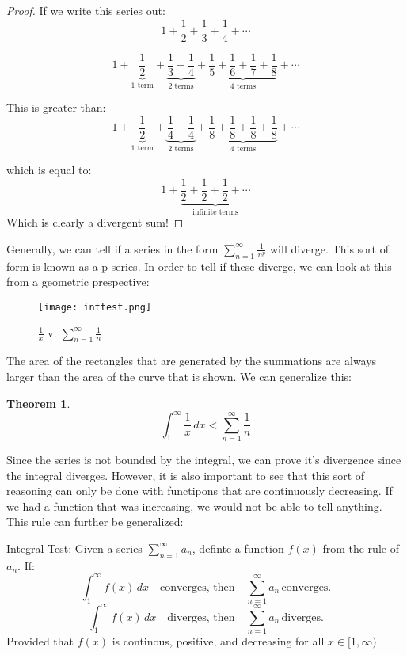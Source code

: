 \documentclass[a4paper, 11pt]{article}
\newtheorem{theorem}{Theorem}
\newenvironment{concept}{%
    \vspace{1em}
    \begin{tcolorbox}[colframe=black!70, colback=white!95, title=Definition]
}{%
    \end{tcolorbox}
    \vspace{1em}
}
\begin{document}
\begin{proof}
    If we write this series out: 
    \[
        1 + \frac{1}{2} + \frac{1}{3} + \frac{1}{4} + \cdots
        \]
         
        \[
        1 + \underbrace{\frac{1}{2}}_{\text{1 term}} + \underbrace{\frac{1}{3} + \frac{1}{4}}_{\text{2 terms}} + \underbrace{\frac{1}{5} + \frac{1}{6} + \frac{1}{7} + \frac{1}{8}}_{\text{4 terms}} + \cdots
        \]
        
        This is greater than:
        \[
        1 + \underbrace{\frac{1}{2}}_{\text{1 term}} + \underbrace{\frac{1}{4} + \frac{1}{4}}_{\text{2 terms}} + \underbrace{\frac{1}{8} + \frac{1}{8} + \frac{1}{8} + \frac{1}{8}}_{\text{4 terms}} + \cdots
        \]
        
        which is equal to:
        \[
        1 + \underbrace{\frac{1}{2} + \frac{1}{2} + \frac{1}{2} + \cdots}_{\text{infinite terms}}
        \]
        Which is clearly a divergent sum!
\end{proof}
Generally, we can tell if a series in the form \(\sum_{n=1}^\infty \frac{1}{n^p}\) will diverge. This sort of form is known as a p-series. In order to tell if these diverge, we can look at this from a geometric prespective:
\begin{figure}[h]
    \caption{$\frac{1}{x}$ v.  \(\sum_{n=1}^\infty \frac{1}{n}\)}
    \centering
    \texttt{[image: inttest.png]} %
\end{figure}
The area of the rectangles that are generated by the summations are always larger than the area of the curve that is shown. We can generalize this:
\begin{theorem}
    \[
    \int_1^{\infty} \frac{1}{x} \, dx < \sum_{n=1}^\infty \frac{1}{n}
    \]
\end{theorem}
Since the series is not bounded by the integral, we can prove it's divergence since the integral diverges. However, it is also important to see that this sort of reasoning can only be done with functipons that are continuously decreasing. If we had a function that was increasing, we would not be able to tell anything. This rule can further be generalized:
\begin{concept}{Integral Test}: 
    Given a series \(\sum_{n=1}^{\infty} a_n\), definte a function $f(x)$ from the rule of $a_n$. If: 
    \[
\int_{1}^{\infty} f(x) \, dx \quad \text{converges, then} \quad \sum_{n=1}^{\infty} a_n \, \text{converges.}
\]
\[
\int_{1}^{\infty} f(x) \, dx \quad \text{diverges, then} \quad \sum_{n=1}^{\infty} a_n \, \text{diverges.}
\]
Provided that $f(x)$ is continous, positive, and decreasing for all $x\in[1,\infty)$
\end{concept}
\end{document}
